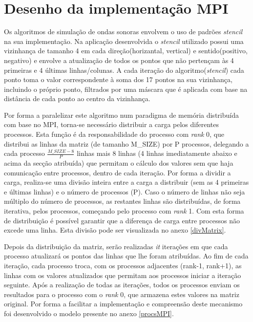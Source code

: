 \documentclass{article}
\begin{document}
\section{Desenho da implementação MPI} \label{desenho}
Os algoritmos de simulação de ondas sonoras envolvem o uso de padrões \textit{stencil} na sua implementação. Na 
aplicação desenvolvida o \textit{stencil} utilizado possui uma vizinhança de tamanho 4 em cada direção(horizantal, vertical) e sentido(positivo, negativo) e envolve a atualização de todos os pontos que não pertençam às 4 primeiras 
e 4 últimas linhas/colunas. A cada iteração do algoritmo(\textit{stencil}) cada ponto toma o valor correspondente 
à soma dos 17 pontos na sua vizinhança, incluindo o próprio ponto, filtrados por uma máscara que é aplicada com base na
distância de cada ponto ao centro da vizinhança.

Por forma a paralelizar este algoritmo num paradigma de memória distribuída com base no MPI, torna-se necessário distribuir a carga pelos 
diferentes processos. Esta função é da responsabilidade do processo com \textit{rank} 0, que distribui as linhas da 
matriz (de tamanho M\_SIZE) por P processos, delegando a cada processo $\frac{M\_SIZE-8}{P}$ linhas mais 8 linhas (4 
linhas imediatamente abaixo e acima da secção atribuída) que permitam o cálculo dos valores sem que haja comunicação 
entre processos, dentro de cada iteração. Por forma a dividir a carga, realiza-se uma divisão inteira entre a carga a 
distribuir (sem as 4 primeiras e últimas linhas) e o número de processos (P). Caso o número de linhas não seja
múltiplo do número de processos, as restantes linhas são distribuídas, de forma iterativa, pelos processos, começando
pelo processo com \textit{rank} 1. Com esta forma de distribuição é possível garantir que a diferença de carga entre processos não excede uma linha. Esta divisão pode ser visualizada no anexo \ref{divMatrix}. 

Depois da distribuição da matriz, serão realizadas \textit{it} iterações em que cada processo atualizará os pontos 
das linhas que lhe foram atribuídas. Ao fim de cada iteração, cada processo troca, com os processos adjacentes
(rank-1, rank+1), as linhas com os valores atualizados que permitam aos processos iniciar a iteração seguinte. Após 
a realização de todas as iterações, todos os processos enviam os resultados para o processo com o \textit{rank} 0, 
que armazena estes valores na matriz original. Por forma a facilitar a implementação e compreensão deste mecanismo foi 
desenvolvido o modelo presente no anexo \ref{procsMPI}. 
\end{document}
